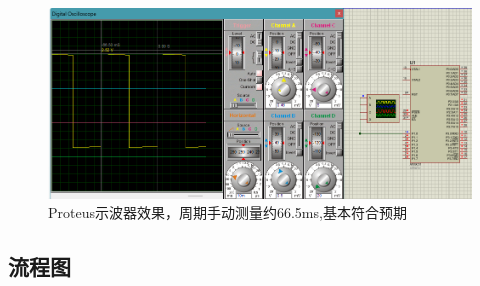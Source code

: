 \documentclass[12pt,hyperref,a4paper,UTF8]{ctexart}
\begin{document}
\begin{figure}[H] %
    \centering
    \includegraphics[width=1\textwidth]{figures/201.png} %
    \caption{Proteus示波器效果，周期手动测量约66.5ms,基本符合预期} %
    \label{fig:example} %
\end{figure}






\subsection{流程图}
\end{document}
